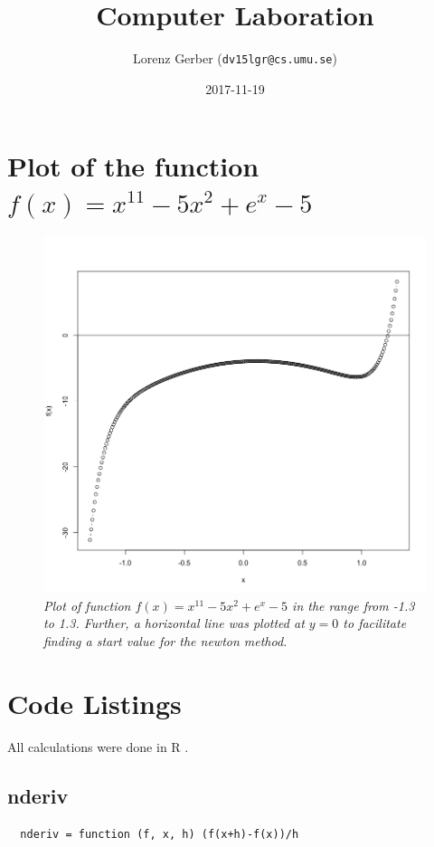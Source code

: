 \documentclass[a4paper,11pt,twoside]{article}
\title{Computer Laboration}
\author{Lorenz Gerber ({\tt{dv15lgr@cs.umu.se}})}
\date{2017-11-19}
\begin{document}
\lstset{language=R}
\maketitle
\thispagestyle{empty}
\newpage

\clearpage
{}

\section{Plot of the function $f(x) = x^{11}-5x^2+e^x-5$}

\begin{figure}[h!]
  \centering
  \includegraphics[width=1\textwidth]{plot1}
  \caption{\textit{Plot of function $f(x) = x^{11}-5x^2+e^x-5$ in the range from -1.3 to 1.3. Further, a horizontal line was plotted at $y = 0$ to facilitate finding a start value for the newton method.}}
\end{figure}

\section{Code Listings}
All calculations were done in R \cite{rlanguage}.
\subsection{nderiv}
\begin{lstlisting}
  nderiv = function (f, x, h) (f(x+h)-f(x))/h
\end{lstlisting}
\end{document}
